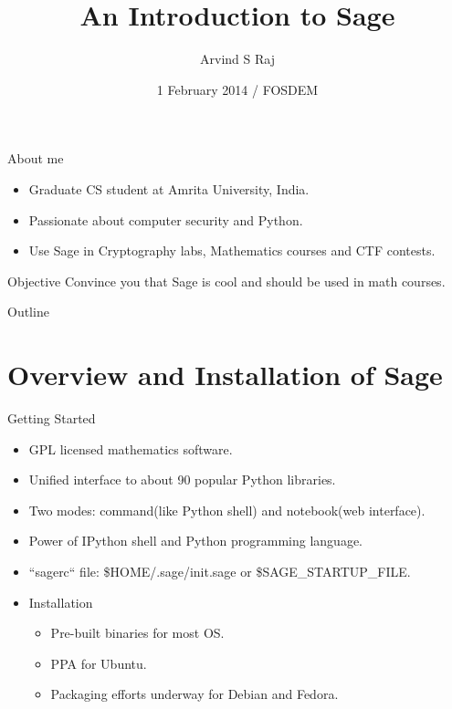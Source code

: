 \documentclass{beamer}
\title{An Introduction to Sage}
\author[Arvind]
{Arvind S Raj}
\institute[Amrita]
{
  Department of Cybersecurity Systems and Networks\\
  Amrita University, India
}
\date[FOSDEM 2014]
{1 February 2014 / FOSDEM}
\begin{document}
\begin{frame}
  \titlepage
\end{frame}

\begin{frame}{About me}
  \begin{itemize}
    \item Graduate CS student at Amrita University, India.
    \item Passionate about computer security and Python.
    \item Use Sage in Cryptography labs, Mathematics courses and CTF contests.
  \end{itemize}
\end{frame}

\begin{frame}{Objective}
  \Large Convince you that Sage is cool and should be used in math courses.
\end{frame}

\begin{frame}{Outline}
  \tableofcontents[hideallsubsections]
\end{frame}

\section{Overview and Installation of Sage}
\begin{frame}{Getting Started}
  \begin{itemize}
   \item GPL licensed mathematics software.
   \item Unified interface to about 90 popular Python libraries.
   \item Two modes: command(like Python shell) and notebook(web interface).
   \item Power of IPython shell and Python programming language.
   \item ``sagerc`` file: \$HOME/.sage/init.sage or \$SAGE\_STARTUP\_FILE.
   \item Installation
    \begin{itemize}
     \item Pre-built binaries for most OS.
     \item PPA for Ubuntu.
     \item Packaging efforts underway for Debian and Fedora.
    \end{itemize}
  \end{itemize}
\end{frame}
\end{document}
